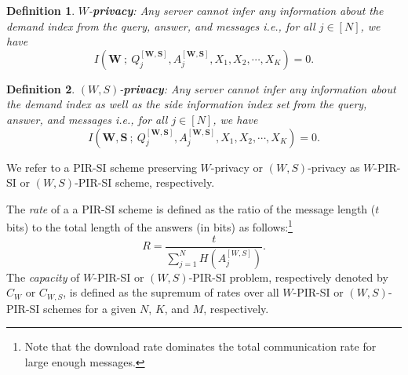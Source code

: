 \documentclass[letterpaper, 10 pt, conference]{ieeeconf}
\newcommand\swanand[1]{\notee[swanand]{#1}}
\newtheorem{definition}{Definition}
\newcommand{\Xj}[1]{X_{#1}} %
\newcommand{\Q}[2]{Q^{[#1, #2]}} %
\newcommand{\A}[2]{A^{[#1,#2]}} %
\newcommand{\Hp}[1]{H\left(#1\right)} %
\newcommand{\I}[2]{I\left(#1\: ; \: #2\right)} %
\begin{document}
\begin{itemize}
\begin{definition}
$W$-\textbf{privacy}: Any server cannot infer any information about the demand index from the query, answer, and messages %
i.e., for all $j\in[N]$, we have
\begin{equation}
\label{eq:privacy}
\I{\mathbf{W}}{\Q{\mathbf{W}}{\mathbf{S}}_j,\A{\mathbf{W}}{\mathbf{S}}_j,\Xj{1}, \Xj{2},\cdots,\Xj{K}} = 0.
\end{equation} 
\end{definition}

\begin{definition}
$(W,S)$-\textbf{privacy}: Any server cannot infer any information about the demand index as well as the side information index set from the query, answer, and messages
i.e., for all $j\in[N]$, we have
\begin{equation}
\label{eq:privacy2}
\I{\mathbf{W},\mathbf{S}}{\Q{\mathbf{W}}{\mathbf{S}}_j,\A{\mathbf{W}}{\mathbf{S}}_j,\Xj{1},\Xj{2},\cdots,\Xj{K}} = 0.
\end{equation}
\end{definition}



We refer to a PIR-SI scheme preserving $W$-privacy or $(W,S)$-privacy as $W$-PIR-SI or $(W,S)$-PIR-SI scheme, respectively. 
\end{itemize}

The \emph{rate} of a a PIR-SI scheme is defined as the ratio of the message length ($t$ bits) to the total length of the answers (in bits) as follows:\footnote{Note that the download rate dominates the total communication rate for large enough messages.}
\begin{equation}
\label{eq:rate}
R = \frac{t}{\sum_{j=1}^{N}\Hp{\A{W}{S}_j}}.
\end{equation}
The \emph{capacity} of $W$-PIR-SI or $(W,S)$-PIR-SI problem, respectively denoted by $C_{W}$ or $C_{W,S}$, is defined as the supremum  of rates over all $W$-PIR-SI or $(W,S)$-PIR-SI schemes for a given $N$, $K$, and $M$, respectively. 




\end{document}
